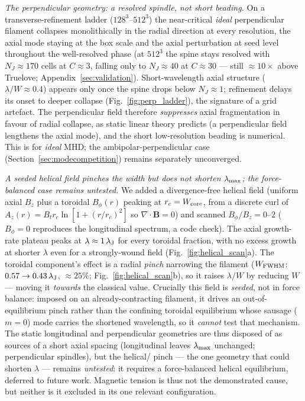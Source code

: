 \documentclass[usenatbib,twoside,twocolumn]{mnras}
\begin{document}
\emph{The perpendicular geometry: a resolved spindle, not short beading.} On a transverse-refinement ladder ($128^3$--$512^3$) the near-critical \emph{ideal} perpendicular filament collapses monolithically in the radial direction at every resolution, the axial mode staying at the box scale and the axial perturbation at seed level throughout the well-resolved phase (at $512^3$ the spine stays resolved with $N_J\approx170$ cells at $C\approx3$, falling only to $N_J\approx40$ at $C\approx30$ --- still $\approx10\times$ above Truelove; Appendix~\ref{sec:validation}). Short-wavelength axial structure ($\lambda/W\approx0.4$) appears only once the spine drops below $N_J\approx1$; refinement delays its onset to deeper collapse (Fig.~\ref{fig:perp_ladder}), the signature of a grid artefact. The perpendicular field therefore \emph{suppresses} axial fragmentation in favour of radial collapse, as static linear theory predicts (a perpendicular field lengthens the axial mode), and the short low-resolution beading is numerical. This is for \emph{ideal} MHD; the ambipolar-perpendicular case (Section~\ref{sec:modecompetition}) remains separately unconverged.

\emph{A seeded helical field pinches the width but does not shorten $\lambda_{\rm max}$; the force-balanced case remains untested.} We added a divergence-free helical field (uniform axial $B_z$ plus a toroidal $B_\phi(r)$ peaking at $r_c=W_{\rm core}$, from a discrete curl of $A_z(r)=B_t r_c\ln[1+(r/r_c)^2]$ so $\nabla\!\cdot\!\mathbf{B}=0$) and scanned $B_\phi/B_z=0$--$2$ ($B_\phi=0$ reproduces the longitudinal spectrum, a code check). The axial growth-rate plateau peaks at $\lambda\approx1\,\lambda_{\rm J}$ for every toroidal fraction, with no excess growth at shorter $\lambda$ even for a strongly-wound field (Fig.~\ref{fig:helical_scan}a). The toroidal component's effect is a radial \emph{pinch} narrowing the filament ($W_{\rm FWHM}$: $0.57\to0.43\,\lambda_{\rm J}$, $\approx25\%$; Fig.~\ref{fig:helical_scan}b), so it raises $\lambda/W$ by reducing $W$ --- moving it \emph{towards} the classical value. Crucially this field is \emph{seeded}, not in force balance: imposed on an already-contracting filament, it drives an out-of-equilibrium pinch rather than the confining toroidal equilibrium whose sausage ($m=0$) mode carries the shortened \citet{Fiege2000} wavelength, so it \emph{cannot} test that mechanism. The static longitudinal and perpendicular geometries are thus disposed of as sources of a short axial spacing (longitudinal leaves $\lambda_{\rm max}$ unchanged; perpendicular spindles), but the helical/\citet{Fiege2000} pinch --- the one geometry that could shorten $\lambda$ --- remains \emph{untested}: it requires a force-balanced helical equilibrium, deferred to future work. Magnetic tension is thus not the demonstrated cause, but neither is it excluded in its one relevant configuration.
\end{document}
